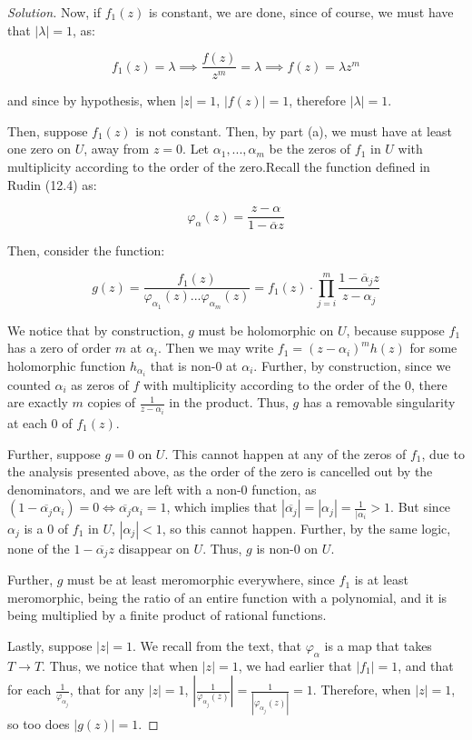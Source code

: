 \documentclass[10pt]{article}
\begin{document}
\begin{proof}[Solution]
Now, if $f_1(z)$ is constant, we are done, since of course, we must have that $|\lambda| = 1$, as:

$$f_1(z) = \lambda \implies \frac{f(z)}{z^m} = \lambda \implies f(z) = \lambda z^m$$

and since by hypothesis, when $|z| = 1$, $|f(z)| = 1$, therefore $|\lambda| = 1$.

Then, suppose $f_1(z)$ is not constant. Then, by part (a), we must have at least one zero on $U$, away from $z= 0$. Let $\alpha_1,...,\alpha_m$ be the zeros of $f_1$ in $U$ with multiplicity according to the order of the zero.Recall the function defined in Rudin (12.4) as:

$$\varphi_\alpha(z) = \frac{z - \alpha}{1 - \overline{\alpha}z} $$

Then, consider the function:

$$g(z) = \frac{f_1(z)}{\varphi_{\alpha_1}(z) ... \varphi_{\alpha_m}(z)} = f_1(z) \cdot \prod_{j=i}^m \frac{1 - \overline{\alpha}_j z}{z - \alpha_j}$$

We notice that by construction, $g$ must be holomorphic on $U$, because suppose $f_1$ has a zero of order $m$ at $\alpha_i$. Then we may write $f_1 = (z-\alpha_i)^m h(z)$ for some holomorphic function $h_{\alpha_i}$ that is non-0 at $\alpha_i$. Further, by construction, since we counted $\alpha_i$ as zeros of $f$ with multiplicity according to the order of the 0, there are exactly $m$ copies of $\frac{1}{z-\alpha_i}$ in the product. Thus, $g$ has a removable singularity at each 0 of $f_1(z)$.

Further, suppose $g = 0$ on $U$. This cannot happen at any of the zeros of $f_1$, due to the analysis presented above, as the order of the zero is cancelled out by the denominators, and we are left with a non-0 function, as $(1 - \overline{\alpha_j}\alpha_i) = 0 \iff  \overline{\alpha_j}\alpha_i = 1$, which implies that $| \overline{\alpha_j} | = | \alpha_j | = \frac{1}{|\alpha_i} > 1$. But since $\alpha_j$ is a 0 of $f_1$ in $U$, $|\alpha_j| < 1$, so this cannot happen. Further, by the same logic, none of the $1 - \overline{\alpha_j} z$ disappear on $U$. Thus, $g$ is non-0 on $U$.

Further, $g$ must be at least meromorphic everywhere, since $f_1$ is at least meromorphic, being the ratio of an entire function with a polynomial, and it is being multiplied by a finite product of rational functions.

Lastly, suppose $|z| = 1$. We recall from the text, that $\varphi_\alpha$ is a map that takes $T \to T$. Thus, we notice that when $|z| = 1$, we had earlier that $|f_1| = 1$, and that for each $\frac{1}{\varphi_{\alpha_j}}$, that for any $|z| = 1$,  $\left|\frac{1}{\varphi_{\alpha_j}(z) }\right| = \frac{1}{|\varphi_{\alpha_j}(z)| } = 1$. Therefore, when $|z| = 1$, so too does $|g(z)| = 1$.


\end{proof}
\end{document}
